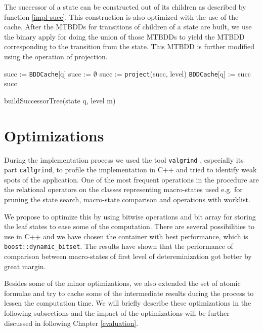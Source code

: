  The successor of a state can be constructed out of its children
 as described by function \ref{impl-succ}.
 This construction is also optimized with the use of the cache. After the MTBDDs
 for transitions of children of a state are built, we use the binary apply for doing
 the union of those MTBDDs to yield the MTBDD corresponding to the transition
 from the state. This MTBDD is further modified using the operation of
 projection.
 
\begin{function}[h!]
		\BlankLine
		\nl succ := \texttt{BDDCache}[q]\;
		\nl {}
		\nl succ := $\emptyset$\;
		\nl{}
		\nl succ := \texttt{project}(succ, level)\;
		\nl \texttt{BDDCache}[q] := succ\;
		\nl \Return succ\;
		\caption{buildSuccessorTree(state q, level m)}\label{impl-succ}
	\end{function}
 
 \section{Optimizations}
 
 During the implementation process we used the tool \texttt{valgrind}
 \cite{valgrind}, especially its part \texttt{callgrind}, to profile the
 implementation in C++ and tried to identify weak spots of the application.
 One of the most frequent operations in the procedure are the relational
 operators on the classes representing macro-states used e.g. for pruning the
 state search, macro-state comparison and operations with worklist.
 
 We propose to optimize this by using bitwise operations and bit array for
 storing the leaf states to ease some of the computation. There are several
 possibilities to use in C++ \cite{bitwise} and we have chosen the container
 with best performance, which is \texttt{boost::dynamic\_bitset}. The results
 have shown that the performance of comparison between macro-states of first
 level of detereminization got better by great margin. 
 
 Besides some of the minor optimizations, we also extended the set of atomic
 formulae and try to cache some of the intermediate results during the
 process to lessen the computation time. We will briefly describe these
 optimizations in the following subsections and the impact of the optimizations
 will be further discussed in following Chapter \ref{evaluation}.
 
